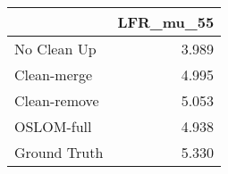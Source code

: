 \begin{tabular}{lr}
\toprule
{} & LFR_mu_55 \\
\midrule
No Clean Up  &     3.989 \\
Clean-merge  &     4.995 \\
Clean-remove &     5.053 \\
OSLOM-full   &     4.938 \\
Ground Truth &     5.330 \\
\bottomrule
\end{tabular}
